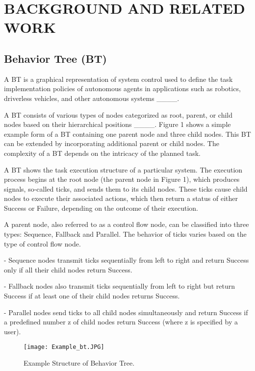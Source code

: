\section{BACKGROUND AND RELATED WORK}
\subsection{Behavior Tree (BT)}
A BT is a graphical representation of system control used to define the task implementation policies of autonomous agents in applications such as robotics, driverless vehicles, and other autonomous systems ____. 

A BT consists of various types of nodes categorized as root, parent, or child nodes based on their hierarchical positions ____. Figure 1 shows a simple example form of a BT containing one parent node and three child nodes. This BT can be extended by incorporating additional parent or child nodes. The complexity of a BT depends on the intricacy of the planned task. 

A BT shows the task execution structure of a particular system. The execution process begins at the root node (the parent node in Figure 1), which produces signals, so-called ticks, and sends them to its child nodes. These ticks cause child nodes to execute their associated actions, which then return a status of either Success or Failure, depending on the outcome of their execution.

A parent node, also referred to as a control flow node, can be classified into three types: Sequence, Fallback and Parallel. The behavior of ticks varies based on the type of control flow node.

-	Sequence nodes transmit ticks sequentially from left to right and return Success only if all their child nodes return Success.

-	Fallback nodes also transmit ticks sequentially from left to right but return Success if at least one of their child nodes returns Success.

-	Parallel nodes send ticks to all child nodes simultaneously and return Success if a predefined number z of child nodes return Success (where z is specified by a user).


\begin{figure}[t]
    \centering
    \texttt{[image: Example\_bt.JPG]} %
    \caption{Example Structure of Behavior Tree.}
    \label{fig:example}
\end{figure}


